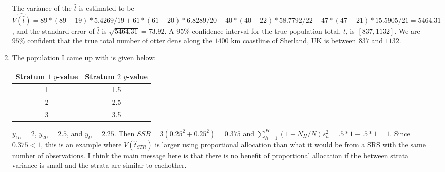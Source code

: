 \documentclass[12pt]{article}\usepackage[]{graphicx}\usepackage[]{color}
\begin{document}
\begin{doublespacing}
\begin{enumerate}
The variance of the $\hat{t}$ is estimated to be $\widehat{V(\hat{t})} = 89*(89-19)*5.4269/19 + 61*(61-20)*6.8289/20 + 40*(40-22)*58.7792/22 + 47*(47-21)*15.5905/21 = 5464.31$, and the standard error of $\hat{t}$ is $\sqrt{5464.31} = 73.92$. A $95\%$ confidence interval for the true population total, $t$, is $[837, 1132]$. We are $95\%$ confident that the true total number of otter dens along the $1400$ km coastline of Shetland, UK is between $837$ and $1132$.

\item The population I came up with is given below:

\begin{table}[H]
\centering
\begin{tabular}{c|c}
Stratum $1$ $y$-value & Stratum $2$ $y$-value \\
\hline
1 & 1.5 \\
2 & 2.5 \\
3 & 3.5 \\
\hline
\end{tabular}
\end{table}

\noindent $\bar{y}_{1U} = 2$, $\bar{y}_{2U} = 2.5$, and $\bar{y}_U = 2.25$. Then $SSB = 3(0.25^2+0.25^2) = 0.375$ and $\sum_{h=1}^H(1-N_H/N)s_h^2 = .5*1+.5*1=1$. Since $0.375 < 1$, this is an example where $V(\hat{t}_{STR})$ is larger using proportional allocation than what it would be from a SRS with the same number of observations. I think the main message here is that there is no benefit of proportional allocation if the between strata variance is small and the strata are similar to eachother.

\end{enumerate}

\end{doublespacing}
\end{document}
